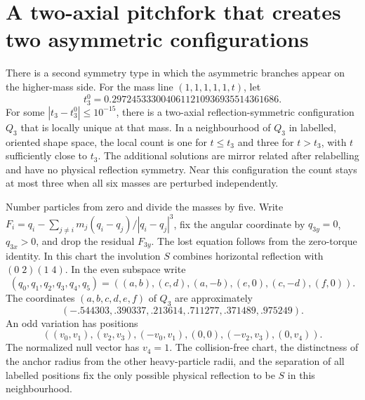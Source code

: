 \documentclass[11pt]{article}
\begin{document}
\section{A two-axial pitchfork that creates two asymmetric configurations}
\label{sec:two-axial-pitch}
There is a second symmetry type in which the asymmetric branches appear on
the higher-mass side. For the mass line $(1,1,1,1,1,t)$, let
\[
 t_3^0=0.2972453330040611210936935514361686 .
\]
For some $|t_3-t_3^0|\le 10^{-15}$, there is a two-axial reflection-symmetric
configuration $Q_3$ that is locally unique at that mass. In a neighbourhood of
$Q_3$ in labelled, oriented shape space, the local count is one for
$t\le t_3$ and three for $t>t_3$, with $t$ sufficiently close to $t_3$.
The additional solutions are mirror related after relabelling and have no
physical reflection symmetry. Near this configuration the count stays at most
three when all six masses are perturbed independently.

Number particles from zero and divide the masses by five. Write
$F_i=q_i-\sum_{j\ne i}m_j(q_i-q_j)/|q_i-q_j|^3$, fix the angular coordinate
by $q_{3y}=0$, $q_{3x}>0$, and drop the residual $F_{3y}$. The lost
equation follows from the zero-torque identity. In this chart the involution
$S$ combines horizontal reflection with $(0\;2)(1\;4)$.
In the even subspace write
\[
 (q_0,q_1,q_2,q_3,q_4,q_5)
 =((a,b),(c,d),(a,-b),(e,0),(c,-d),(f,0)).
\]
The coordinates $(a,b,c,d,e,f)$ of $Q_3$ are approximately
\[
(-.544303,.390337,.213614,.711277,.371489,.975249).
\]
An odd variation has positions
\[
((v_0,v_1),(v_2,v_3),(-v_0,v_1),(0,0),(-v_2,v_3),(0,v_4)).
\]
The normalized null vector has $v_4=1$. The collision-free chart, the
distinctness of the anchor radius from the other heavy-particle radii, and
the separation of all labelled positions fix the only possible physical
reflection to be $S$ in this neighbourhood.
\end{document}
